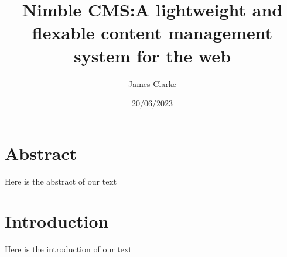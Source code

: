 \documentclass[12pt]{report}
\title{Nimble CMS:\@ A lightweight and flexable content management system for the web}
\author{James Clarke}
\date{20/06/2023}
\begin{document}
\maketitle

\section{Abstract}

Here is the abstract of our text

\section{Introduction}

Here is the introduction of our text
\end{document}

